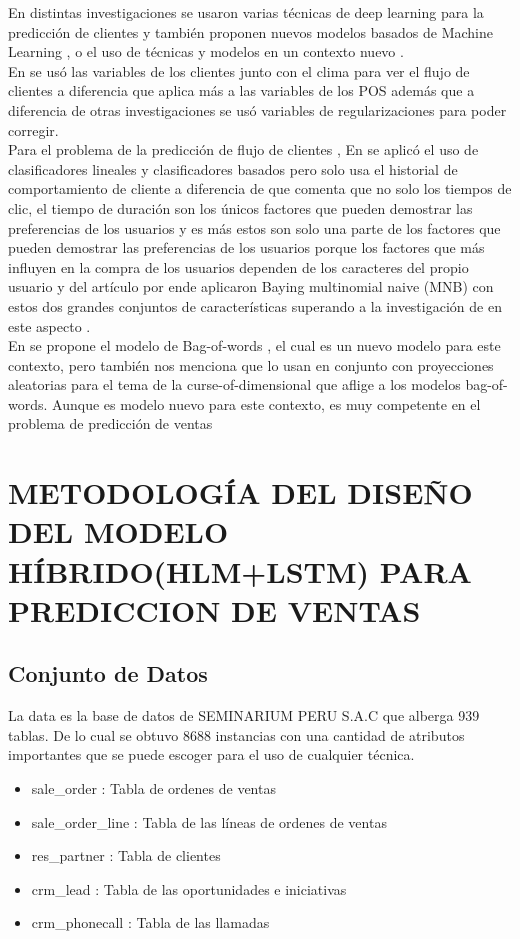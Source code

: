 \documentclass[conference]{IEEEtran}
\begin{document}
En distintas investigaciones se usaron varias técnicas de deep learning para la predicción de clientes \cite{b11} \cite{b12} y también proponen nuevos modelos basados de Machine Learning \cite{b13} \cite{b14}, o el uso de técnicas y modelos en un contexto nuevo \cite{b23}.\\
En \cite{b11} se usó las variables de los clientes junto con el clima para ver el flujo de clientes a diferencia \cite{b12} que aplica más a las variables de los POS además que a diferencia de otras investigaciones se usó variables de regularizaciones para poder corregir.\\
Para el problema de la predicción de flujo de clientes , En \cite{b13} se aplicó el uso de clasificadores lineales y clasificadores basados pero solo usa el historial de comportamiento de cliente a diferencia de  \cite{b14} que comenta que no solo los tiempos de clic, el tiempo de duración son los únicos factores que pueden demostrar las preferencias de los usuarios y es más estos son solo una parte de los factores que pueden demostrar las preferencias de los usuarios porque los factores que más influyen en la compra de los usuarios dependen de los caracteres del propio usuario y del artículo por ende aplicaron Baying multinomial naive (MNB) con estos dos grandes conjuntos de características superando a la investigación de \cite{b13}  en este aspecto .\\
En \cite{b23} se propone el modelo de Bag-of-words , el cual es un nuevo modelo para este contexto, pero también nos menciona que lo usan en conjunto con proyecciones aleatorias para el tema de la curse-of-dimensional que aflige a los modelos bag-of-words. Aunque es modelo nuevo para este contexto, es muy competente en el problema de predicción de ventas
\section{METODOLOGÍA DEL DISEÑO DEL MODELO HÍBRIDO(HLM+LSTM) PARA PREDICCION DE VENTAS}
\subsection{Conjunto de Datos}
La data es la base de datos de SEMINARIUM PERU S.A.C que alberga 939 tablas. De lo cual se obtuvo 8688 instancias con una cantidad de atributos importantes que se puede escoger para el uso de cualquier técnica.
\begin{itemize}
    \item sale\_order : Tabla de ordenes de ventas
    \item sale\_order\_line : Tabla de las líneas de ordenes de ventas
    \item res\_partner : Tabla de clientes
    \item crm\_lead : Tabla de las oportunidades e iniciativas
    \item crm\_phonecall : Tabla de las llamadas
\end{itemize}
\end{document}
